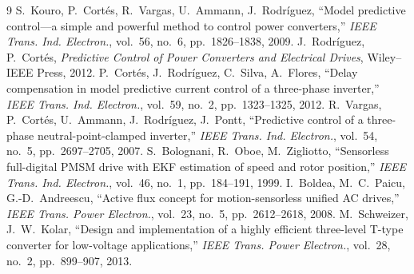 \documentclass[10pt,a4paper]{scrartcl}
\begin{document}
\begin{onehalfspace}
\begin{thebibliography}{9}
 S.~Kouro, P.~Cortés, R.~Vargas, U.~Ammann, J.~Rodríguez, ``Model predictive control---a simple and powerful method to control power converters,'' \emph{IEEE Trans. Ind. Electron.}, vol.~56, no.~6, pp.~1826--1838, 2009.
 J.~Rodríguez, P.~Cortés, \emph{Predictive Control of Power Converters and Electrical Drives}, Wiley--IEEE Press, 2012.
 P.~Cortés, J.~Rodríguez, C.~Silva, A.~Flores, ``Delay compensation in model predictive current control of a three-phase inverter,'' \emph{IEEE Trans. Ind. Electron.}, vol.~59, no.~2, pp.~1323--1325, 2012.
 R.~Vargas, P.~Cortés, U.~Ammann, J.~Rodríguez, J.~Pontt, ``Predictive control of a three-phase neutral-point-clamped inverter,'' \emph{IEEE Trans. Ind. Electron.}, vol.~54, no.~5, pp.~2697--2705, 2007.
 S.~Bolognani, R.~Oboe, M.~Zigliotto, ``Sensorless full-digital PMSM drive with EKF estimation of speed and rotor position,'' \emph{IEEE Trans. Ind. Electron.}, vol.~46, no.~1, pp.~184--191, 1999.
 I.~Boldea, M.~C.~Paicu, G.-D.~Andreescu, ``Active flux concept for motion-sensorless unified AC drives,'' \emph{IEEE Trans. Power Electron.}, vol.~23, no.~5, pp.~2612--2618, 2008.
 M.~Schweizer, J.~W.~Kolar, ``Design and implementation of a highly efficient three-level T-type converter for low-voltage applications,'' \emph{IEEE Trans. Power Electron.}, vol.~28, no.~2, pp.~899--907, 2013.
\end{thebibliography}

\end{onehalfspace}
\end{document}
